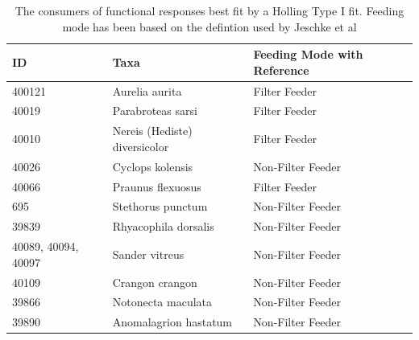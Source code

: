 \documentclass[11pt, a4paper, titlepage]{article}
\begin{document}

\begin{table}[h!]
	\small
	\begin{tabular} {| l | l | l |}  \hline
		\textbf{ID} & \textbf{Taxa} & \textbf{Feeding Mode with Reference} \\ \hline
		400121 & Aurelia aurita & Filter Feeder \parencite{Aurelia} \\ \hline
		40019 & Parabroteas sarsi & Filter Feeder \parencite{Copepod}  \\ \hline
		40010 & Nereis (Hediste) diversicolor & Filter Feeder \parencite{Nereis}  \\ \hline
		40026 &  Cyclops kolensis & Non-Filter Feeder \parencite{Cyclops}  \\ \hline
		40066 & Praunus flexuosus & Filter Feeder \parencite{Praunus}  \\ \hline
		695 & Stethorus punctum &  Non-Filter Feeder \parencite{Stethorus}  \\ \hline
		39839 & Rhyacophila dorsalis &  Non-Filter Feeder \parencite{Rhyacophila}  \\ \hline
		40089, 40094, 40097 & Sander vitreus &  Non-Filter Feeder \parencite{Sander}  \\ \hline
		40109 & Crangon crangon &  Non-Filter Feeder \parencite{Crangon}  \\ \hline
		39866 & Notonecta maculata &  Non-Filter Feeder \parencite{Notonecta}  \\ \hline
		39890 & Anomalagrion hastatum &  Non-Filter Feeder \parencite{}  \\ \hline
	\end{tabular}
	\caption{The consumers of functional responses best fit by a Holling Type I fit. Feeding mode has been based on the defintion used by Jeschke et al \parencite{Jeschke2004}}
\end{table}

\end{document}
